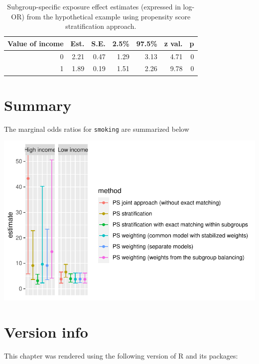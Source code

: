 \documentclass[
  letterpaper,
  DIV=11,
  numbers=noendperiod]{scrreprt}
\begin{document}
\hypertarget{tbl-s-mmws}{}
\begin{table}[!h]
\caption{\label{tbl-s-mmws}Subgroup-specific exposure effect estimates (expressed in log-OR) from
the hypothetical example using propensity score stratification approach. }\tabularnewline

\centering
\begin{tabular}{rrrrrrr}
\toprule
Value of income & Est. & S.E. & 2.5\% & 97.5\% & z val. & p\\
\midrule
0 & 2.21 & 0.47 & 1.29 & 3.13 & 4.71 & 0\\
1 & 1.89 & 0.19 & 1.51 & 2.26 & 9.78 & 0\\
\bottomrule
\end{tabular}
\end{table}

\hypertarget{summary}{%
\section{Summary}\label{summary}}

The marginal odds ratios for \texttt{smoking} are summarized below

\includegraphics{chapter_07_files/figure-pdf/unnamed-chunk-52-1.pdf}

\hypertarget{version-info-2}{%
\section*{Version info}\label{version-info-2}}


This chapter was rendered using the following version of R and its
packages:
\end{document}
